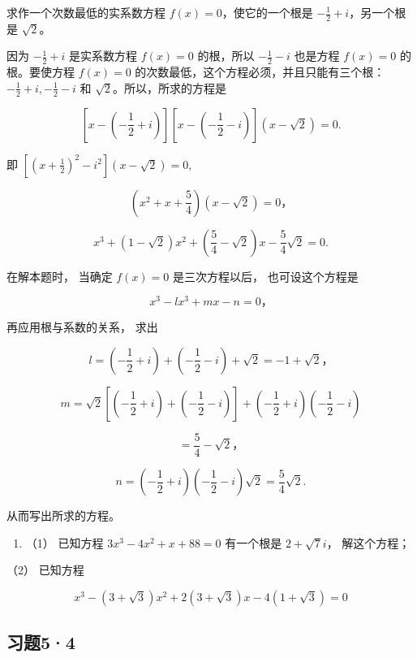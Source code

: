 求作一个次数最低的实系数方程 \(f(x) = 0\)，使它的一个根是
\(-\frac{1}{2}+i\)，另一个根是 \(\sqrt{2}\)。

 因为 \(-\frac{1}{2}+i\) 是实系数方程 \(f(x)=0\)
的根，所以 \(-\frac{1}{2}-i\) 也是方程 \(f(x)=0\) 的根。要使方程
\(f(x)=0\) 的次数最低，这个方程必须，并且只能有三个根：
\(-\frac{1}{2}+i, -\frac{1}{2}-i\) 和 \(\sqrt{2}\)。所以，所求的方程是

\[
\left[ x - \left(- \frac {1}{2} + i\right) \right] \left[ x - \left(- \frac {1}{2} - i\right) \right] (x - \sqrt {2}) = 0.
\]

即
\(\left[\left(x + \frac{1}{2}\right)^2 - i^2\right](x - \sqrt{2}) = 0,\)

\[
\left(x ^ {2} + x + \frac {5}{4}\right) (x - \sqrt {2}) = 0\text{，}
\]

\[
x ^ {3} + (1 - \sqrt {2}) x ^ {2} + \left(\frac {5}{4} - \sqrt {2}\right) x - \frac {5}{4} \sqrt {2} = 0.
\]

 在解本题时， 当确定 \(f(x) = 0\) 是三次方程以后，
也可设这个方程是

\[
x ^ {3} - l x ^ {3} + m x - n = 0\text{，}
\]

再应用根与系数的关系， 求出

\[
l = \left(- \frac {1}{2} + i\right) + \left(- \frac {1}{2} - i\right) + \sqrt {2} = - 1 + \sqrt {2}\text{，}
\]

\[
m = \sqrt {2} \left[ \left(- \frac {1}{2} + i\right) + \left(- \frac {1}{2} - i\right) \right] + \left(- \frac {1}{2} + i\right) \left(- \frac {1}{2} - i\right)
\]

\[
= \frac {5}{4} - \sqrt {2}\text{，}
\]

\[
n = \left(- \frac {1}{2} + i\right) \left(- \frac {1}{2} - i\right) \sqrt {2} = \frac {5}{4} \sqrt {2}.
\]

从而写出所求的方程。

\begin{enumerate}
\item
  （1） 已知方程 \(3x^{3} - 4x^{2} + x + 88 = 0\) 有一个根是
  \(2 + \sqrt{7} i\)， 解这个方程；
\end{enumerate}

（2） 已知方程

\[
x ^ {3} - (3 + \sqrt {3}) x ^ {2} + 2 (3 + \sqrt {3}) x - 4 (1 + \sqrt {3}) = 0
\]

\subsection{习题5·4}

